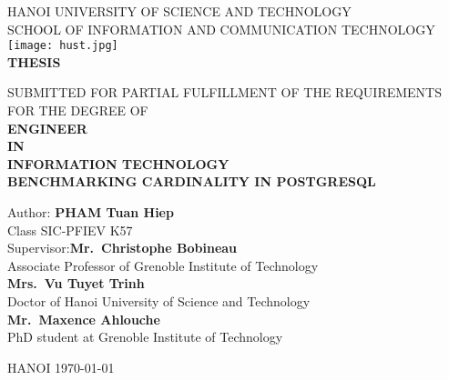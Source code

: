 \begin{titlepage}
	\centering
	{\scshape\large HANOI UNIVERSITY OF SCIENCE AND TECHNOLOGY \\
	SCHOOL OF INFORMATION AND COMMUNICATION TECHNOLOGY\\}
	\vspace{1cm}
	\texttt{[image: hust.jpg]}\\
	\vspace{0.5cm}
	{\scshape\Large\bfseries THESIS\\}
	\vspace{1cm}
	{\Large SUBMITTED FOR PARTIAL FULFILLMENT OF
		THE REQUIREMENTS FOR THE DEGREE OF \\
	\vspace{1cm}
	{\scshape\Large\bfseries ENGINEER \\
	\Large IN \\}
	\vspace{1cm}
	{\scshape\Large\bfseries INFORMATION TECHNOLOGY \\}
	\vspace{1cm}
	{\scshape\Large\bfseries BENCHMARKING CARDINALITY IN POSTGRESQL \\}
	\vspace{1cm}
	\begin{flushleft}
        {\normalsize \hspace{3cm}Author:}       {\normalsize\hspace{1.1cm}\bfseries PHAM Tuan Hiep\\}
        {\normalsize\hspace{5.5cm} Class SIC-PFIEV K57\\}
        {\normalsize \hspace{3cm}Supervisor:}{\normalsize\hspace{0.65cm}\bfseries Mr.\ Christophe Bobineau\\}
        {\normalsize\hspace{5.5cm} Associate Professor of Grenoble Institute of Technology\\}
        {\normalsize\hspace{5.6cm}\bfseries Mrs.\ Vu Tuyet Trinh\\}
        {\normalsize\hspace{5.5cm} Doctor of Hanoi University of Science and Technology\\}
        {\normalsize\hspace{5.6cm}\bfseries Mr.\ Maxence Ahlouche\\}
        {\normalsize\hspace{5.5cm} PhD student at Grenoble Institute of Technology\\}
	\end{flushleft}
	\vspace*{\fill}
	{\large HANOI \today \\}
}\end{titlepage}
